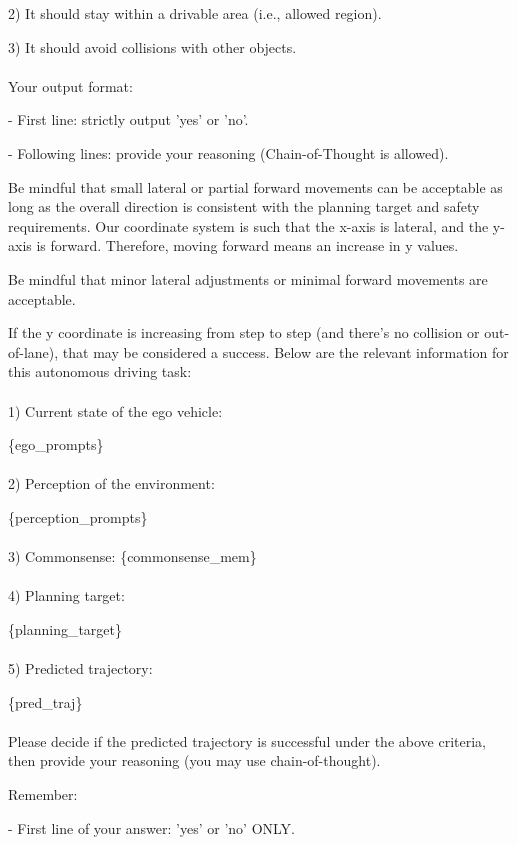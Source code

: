 \documentclass[11pt]{article}
\theoremstyle{plain}
\theoremstyle{definition}
\begin{document}
{\begin{tcolorbox}[systembox]
2) It should stay within a drivable area (i.e., allowed region).

3) It should avoid collisions with other objects.
\\\\
Your output format:
    
- First line: strictly output 'yes' or 'no'.

- Following lines: provide your reasoning (Chain-of-Thought is allowed).

Be mindful that small lateral or partial forward movements can be acceptable as long as the overall direction is consistent with the planning target and safety requirements. Our coordinate system is such that the x-axis is lateral, and the y-axis is forward. Therefore, moving forward means an increase in y values.

Be mindful that minor lateral adjustments or minimal forward movements are acceptable.

If the y coordinate is increasing from step to step (and there's no collision or out-of-lane), that may be considered a success.
Below are the relevant information for this autonomous driving task:
\\\\
1) Current state of the ego vehicle:

\{ego\_prompts\}
\\\\
2) Perception of the environment:

\{perception\_prompts\}
\\\\
3) Commonsense:
\{commonsense\_mem\}
\\\\
4) Planning target:

\{planning\_target\}
\\\\
5) Predicted trajectory:
\end{tcolorbox}

\begin{tcolorbox}[userbox]
\{pred\_traj\}
\\\\
Please decide if the predicted trajectory is successful under the above criteria,
then provide your reasoning (you may use chain-of-thought).

Remember:

- First line of your answer: 'yes' or 'no' ONLY.


\end{tcolorbox}}
\end{document}
